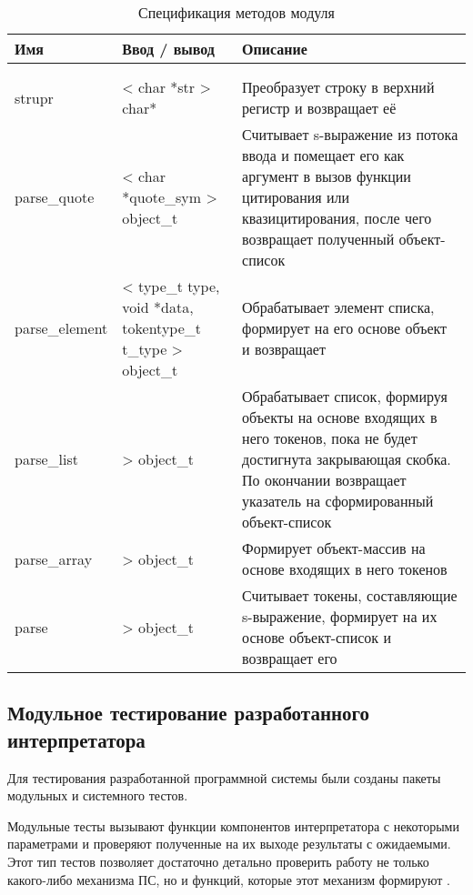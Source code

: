 \begin{xltabular}{\textwidth}{|l|p{3.2cm}|X|}
	\caption{Спецификация методов модуля \label{modinfo_parser_funcs:table}}\\ \hline
	\centrow Имя & \centrow Ввод / вывод & \centrow Описание \\ \hline
	 &  &  \\ \hline
	\endfirsthead
	 &  &  \\ \hline
	\finishhead
	strupr & < char *str \linebreak > char* & Преобразует строку  в верхний регистр и возвращает её \\ \hline
	parse\_quote & < char *quote\_sym \linebreak > object\_t & Считывает s-выражение из потока ввода и помещает его как аргумент в вызов функции цитирования или квазицитирования, после чего возвращает полученный объект-список \\ \hline
	parse\_element & < type\_t type, void *data, tokentype\_t t\_type \linebreak > object\_t & Обрабатывает элемент списка, формирует на его основе объект и возвращает \\ \hline
	parse\_list & > object\_t & Обрабатывает список, формируя объекты на основе входящих в него токенов, пока не будет достигнута закрывающая скобка. По окончании возвращает указатель на сформированный объект-список \\ \hline
	parse\_array & > object\_t & Формирует объект-массив на основе входящих в него токенов  \\ \hline
	parse & > object\_t & Считывает токены, составляющие s-выражение, формирует на их основе объект-список и возвращает его  \\ \hline
\end{xltabular}


\subsection{Модульное тестирование разработанного интерпретатора}

Для тестирования разработанной программной системы были созданы пакеты модульных и системного тестов.

Модульные тесты вызывают функции компонентов интерпретатора с некоторыми параметрами и проверяют полученные на их выходе результаты с ожидаемыми. Этот тип тестов позволяет достаточно детально проверить работу не только какого-либо механизма ПС, но и функций, которые этот механизм формируют \cite{e14}.

